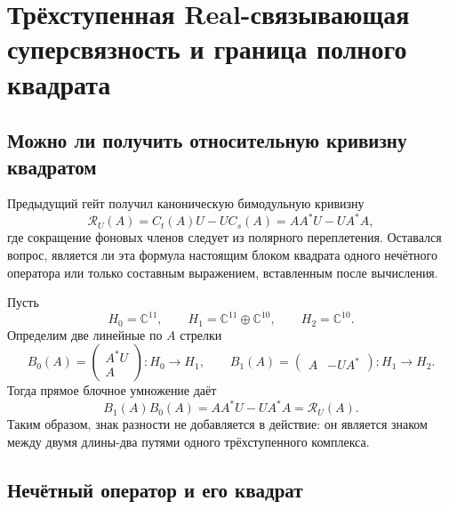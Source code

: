 \chapter{Трёхступенная Real-связывающая суперсвязность и граница полного квадрата}
\label{ch:v7-real-linking-superconnection-assembly-gate}

\section{Можно ли получить относительную кривизну квадратом}

Предыдущий гейт получил каноническую бимодульную кривизну
\begin{equation}
 \mathcal R_U(A)=C_t(A)U-UC_s(A)
 =AA^*U-UA^*A,
 \label{eq:v7-linking-assembly-relative-curvature}
\end{equation}
где сокращение фоновых членов следует из полярного переплетения. Оставался
вопрос, является ли эта формула настоящим блоком квадрата одного нечётного
оператора или только составным выражением, вставленным после вычисления.

Пусть
\begin{equation}
 H_0=\mathbb C^{11},\qquad
 H_1=\mathbb C^{11}\oplus\mathbb C^{10},\qquad
 H_2=\mathbb C^{10}.
 \label{eq:v7-linking-assembly-chain-spaces}
\end{equation}
Определим две линейные по $A$ стрелки
\begin{equation}
 B_0(A)=
 \begin{pmatrix}A^*U\\A\end{pmatrix}:H_0\to H_1,
 \qquad
 B_1(A)=
 \begin{pmatrix}A&-UA^*\end{pmatrix}:H_1\to H_2.
 \label{eq:v7-linking-assembly-arrows}
\end{equation}
Тогда прямое блочное умножение даёт
\begin{equation}
 \boxed{B_1(A)B_0(A)=AA^*U-UA^*A=\mathcal R_U(A).}
 \label{eq:v7-linking-assembly-factorization}
\end{equation}
Таким образом, знак разности не добавляется в действие: он является знаком
между двумя длины-два путями одного трёхступенного комплекса.

\section{Нечётный оператор и его квадрат}

